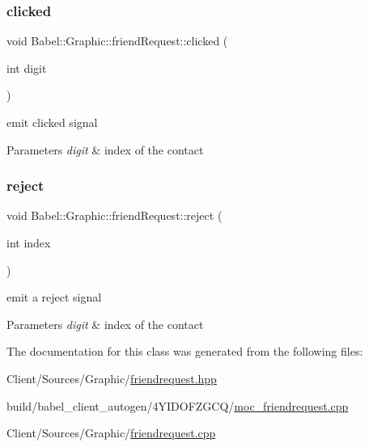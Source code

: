 \subsubsection{\texorpdfstring{clicked}{clicked}}
{\footnotesize\ttfamily void Babel\+::\+Graphic\+::friend\+Request\+::clicked (\begin{DoxyParamCaption}\item[{int}]{digit }\end{DoxyParamCaption})\hspace{0.3cm}{\ttfamily [signal]}}

emit clicked signal 
\begin{DoxyParams}{Parameters}
{\em digit} & index of the contact \\
\hline
\end{DoxyParams}
\mbox{\label{classBabel_1_1Graphic_1_1friendRequest_a7f9bf80ed2985d1ca521a1941bc85a85}} 
\subsubsection{\texorpdfstring{reject}{reject}}
{\footnotesize\ttfamily void Babel\+::\+Graphic\+::friend\+Request\+::reject (\begin{DoxyParamCaption}\item[{int}]{index }\end{DoxyParamCaption})\hspace{0.3cm}{\ttfamily [signal]}}

emit a reject signal 
\begin{DoxyParams}{Parameters}
{\em digit} & index of the contact \\
\hline
\end{DoxyParams}


The documentation for this class was generated from the following files\+:\begin{DoxyCompactItemize}
\item 
Client/\+Sources/\+Graphic/\hyperlink{friendrequest_8hpp}{friendrequest.\+hpp}\item 
build/babel\+\_\+client\+\_\+autogen/4\+Y\+I\+D\+O\+F\+Z\+G\+C\+Q/\hyperlink{build_2babel__client__autogen_24YIDOFZGCQ_2moc__friendrequest_8cpp}{moc\+\_\+friendrequest.\+cpp}\item 
Client/\+Sources/\+Graphic/\hyperlink{friendrequest_8cpp}{friendrequest.\+cpp}\end{DoxyCompactItemize}

